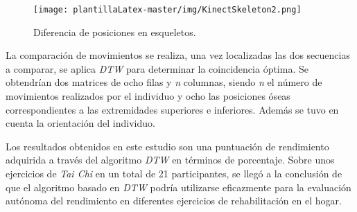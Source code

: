 \begin{figure}[H]
 \centering
    \texttt{[image: plantillaLatex-master/img/KinectSkeleton2.png]}
    \caption{Diferencia de posiciones en esqueletos.}
    \label{f:KinectSkeleton2}
\end{figure}


La comparación de movimientos se realiza, una vez localizadas las dos secuencias a comparar, se aplica \emph{DTW} para determinar la coincidencia óptima. Se obtendrían dos matrices de ocho filas y \textit{n} columnas, siendo \textit{n} el número de movimientos realizados por el individuo y ocho las posiciones óseas correspondientes a las extremidades superiores e inferiores. Además se tuvo en cuenta la orientación del individuo.

Los resultados obtenidos en este estudio son una puntuación de rendimiento adquirida a través del algoritmo \emph{DTW} en términos de porcentaje. Sobre unos ejercicios de \textit{Tai Chi} en un total de 21 participantes, se llegó a la conclusión de que el algoritmo basado en \emph{DTW} podría utilizarse eficazmente para la evaluación autónoma del rendimiento en diferentes ejercicios de rehabilitación en el hogar.
